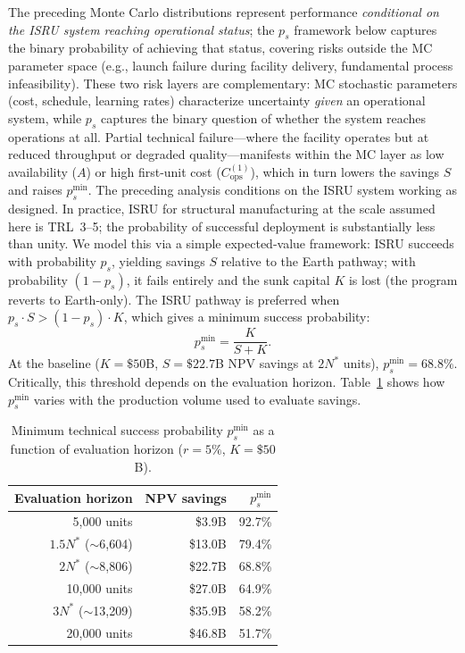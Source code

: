 \documentclass[preprint,12pt]{elsarticle}
\begin{document}
The preceding Monte Carlo distributions represent performance \emph{conditional on the ISRU system reaching operational status}; the $p_s$ framework below captures the binary probability of achieving that status, covering risks outside the MC parameter space (e.g., launch failure during facility delivery, fundamental process infeasibility). These two risk layers are complementary: MC stochastic parameters (cost, schedule, learning rates) characterize uncertainty \emph{given} an operational system, while $p_s$ captures the binary question of whether the system reaches operations at all. Partial technical failure---where the facility operates but at reduced throughput or degraded quality---manifests within the MC layer as low availability ($A$) or high first-unit cost ($C_{\mathrm{ops}}^{(1)}$), which in turn lowers the savings $S$ and raises $p_s^{\min}$. The preceding analysis conditions on the ISRU system working as designed. In practice, ISRU for structural manufacturing at the scale assumed here is TRL~3--5; the probability of successful deployment is substantially less than unity. We model this via a simple expected-value framework: ISRU succeeds with probability $p_s$, yielding savings $S$ relative to the Earth pathway; with probability $(1 - p_s)$, it fails entirely and the sunk capital $K$ is lost (the program reverts to Earth-only). The ISRU pathway is preferred when $p_s \cdot S > (1 - p_s) \cdot K$, which gives a minimum success probability:
\begin{equation}
  p_s^{\min} = \frac{K}{S + K}.
  \label{eq:p_success}
\end{equation}
At the baseline ($K = \$50$B, $S = \$22.7$B NPV savings at $2N^*$ units), $p_s^{\min} = 68.8\%$. Critically, this threshold depends on the evaluation horizon. Table~\ref{tab:ps_horizon} shows how $p_s^{\min}$ varies with the production volume used to evaluate savings.

\begin{table}[htbp]
\centering
\caption{Minimum technical success probability $p_s^{\min}$ as a function of evaluation horizon ($r = 5\%$, $K = \$50$B).}
\label{tab:ps_horizon}
\small
\begin{tabular}{@{}rrr@{}}
\toprule
Evaluation horizon & NPV savings & $p_s^{\min}$ \\
\midrule
5{,}000 units            & \$3.9B   & 92.7\% \\
$1.5 N^*$ ($\sim$6{,}604) & \$13.0B  & 79.4\% \\
$2 N^*$ ($\sim$8{,}806)   & \$22.7B  & 68.8\% \\
10{,}000 units           & \$27.0B  & 64.9\% \\
$3 N^*$ ($\sim$13{,}209)  & \$35.9B  & 58.2\% \\
20{,}000 units           & \$46.8B  & 51.7\% \\
\bottomrule
\end{tabular}
\end{table}
\end{document}
